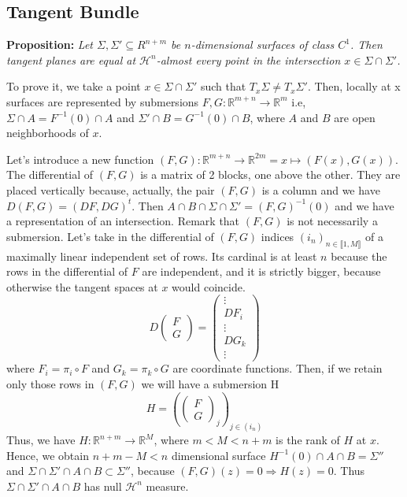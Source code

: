 \documentclass{article}
\begin{document}
\subsection{Tangent Bundle}
\textbf{Proposition:} \textit{Let $\Sigma, \Sigma′\subseteq R^{n+m}$ be
$n$-dimensional surfaces of class $C^1$. Then tangent planes are equal at 
$\mathcal H^n$-almost every point in the intersection $x∈\Sigma\cap\Sigma′$.}

\vspace{1ex}
To prove it, we take a point $x\in\Sigma\cap\Sigma'$ such that $T_x\Sigma\neq T_x
\Sigma'$. Then, locally at x surfaces are represented by submersions $F,G:\mathbb
R^{m+n}\rightarrow\mathbb R^m$ i.e, $\Sigma\cap A=F^{-1}(0)\cap A$ and
$\Sigma'\cap B=G^{-1}(0)\cap B$, where $A$ and $B$ are open neighborhoods of $x$.

\vspace{1ex}
Let's introduce a new function $(F, G):\mathbb R^{m+n}\rightarrow\mathbb R^{2m}
=x\mapsto (F(x),G(x))$. The differential of $(F,G)$ is a matrix of 2 blocks, one
above the other. They are placed vertically because, actually, the pair $(F,G)$ is
a column and we have $D(F,G)=(DF,DG)^t$. Then $A\cap B\cap\Sigma\cap\Sigma'=(F,G)
^{-1}(0)$ and we have a representation of an intersection. Remark
that $(F, G)$ is not necessarily a submersion. Let's take in the differential of $(F
,G)$ indices $(i_n)_{n\in\llbracket1,M\rrbracket}$ of a maximally linear
independent set of rows. Its cardinal is at least $n$ because the rows in the
differential of $F$ are independent, and it is strictly bigger, because otherwise
the tangent spaces at $x$ would coincide.
\[D\left(\begin{array}{cc} F\\ G\end{array}\right) =
    \left(\begin{array}{cc} \vdots \\DF_i\\ \vdots\\ DG_k\\ \vdots\end{array}\right)\]
where $F_i=\pi_i\circ F$ and $G_k=\pi_k\circ G$ are coordinate functions. Then,
if we retain only those rows in $(F,G)$ we will have a submersion H
\[H=\left(\left(\begin{array}{cc} F\\ G\end{array}\right)_j\right)_{j\in(i_n)}\]
Thus, we have $H:\mathbb R^{n+m}\rightarrow\mathbb R^{M}$, where $m<M<n+m$ is the
rank of $H$ at $x$. Hence, we obtain $n+m-M<n$ dimensional surface $H^{-1}(0)\cap
A\cap B=\Sigma''$ and $\Sigma\cap\Sigma'\cap A\cap B\subset\Sigma''$, because
$(F,G)(z)=0\Rightarrow H(z)=0$. Thus $\Sigma\cap\Sigma'\cap A\cap B$ has null
$\mathcal H^n$ measure.
\end{document}
